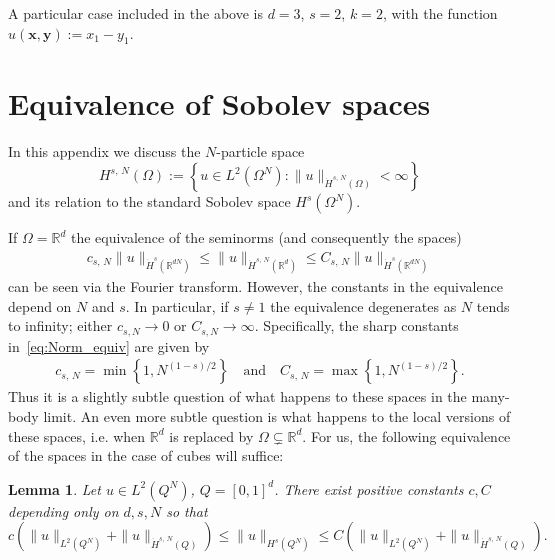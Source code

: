 \documentclass[10pt]{amsart}
\newtheorem{lemm}[theo]{Lemma}\newtheorem{prop}[theo]{Proposition}\newtheorem{coro}[theo]{Corollary}\newtheorem{conj}[theo]{Conjecture}
\theoremstyle{definition}\newtheorem{defi}[theo]{Definition}\newtheorem{rema}[theo]{Remark}\newtheorem{exam}[theo]{Example}\newtheorem{exem}[theo]{Example}\newtheorem{nota}[theo]{Notation}
\newcommand*\R {\mathbb{R}}
\newcommand\1{{\ensuremath {\mathds 1} }}
\newcommand{\bx}{\mathbf{x}}
\newcommand{\by}{\mathbf{y}}
\begin{document}
A particular case included in the above is $d=3$, $s=2$, $k=2$, with the function $u(\bx,\by) := x_1 - y_1$.



\appendix
\section{Equivalence of Sobolev spaces}\label{app:norms}


In this appendix we discuss the $N$-particle space
\begin{equation*}
H^{s,\,N}(\Omega) := \left\{u \in L^2(\Omega^N): \|u\|_{\dot{H}^{s,\,N}(\Omega)}<\infty\right\}
\end{equation*}
and its relation to the standard Sobolev space $H^s(\Omega^N)$.


If $\Omega=\R^d$ the equivalence of the seminorms (and consequently the spaces)
\begin{align}\label{eq:Norm_equiv}
c_{s,\,N}\|u\|_{\dot{H}^s(\R^{dN})}\leq \|u\|_{\dot{H}^{s,\,N}(\R^{d})}\leq C_{s,\,N}\|u\|_{\dot{H}^s(\R^{dN})}
\end{align}
can be seen via the Fourier transform. However, the constants in the equivalence depend on $N$ and $s$. In particular, if $s\neq 1$ the equivalence degenerates as $N$ tends to infinity; either $c_{s,N}\to 0$ or $C_{s,N}\to \infty$. Specifically, the sharp constants in~\eqref{eq:Norm_equiv} are given by
\begin{align*}
c_{s,\,N}=\min\left\{1, N^{(1-s)/2}\right\}
\quad \text{and} \quad C_{s,\,N}= \max\left\{1, N^{\left(1-s\right)/2}\right\}.
\end{align*}
Thus it is a slightly subtle question of what happens to these spaces in the many-body limit. An even more subtle question is what happens to the local versions of these spaces, i.e. when $\R^d$ is replaced by $\Omega \subsetneq \R^d$. For us, the following equivalence of the spaces in the case of cubes will suffice:

\begin{lemm}\label{lem:Equivalence_local_spaces}
Let $u\in L^2(Q^N)$, $Q=[0, 1]^{d}$. There exist positive constants $c, C$ depending only on $d, s, N$ so that
\begin{equation*}
c\left(\|u\|_{L^2\left(Q^N\right)}+\|u\|_{\dot{H}^{s,\,N}(Q)}\right)\leq \|u\|_{H^s(Q^N)}\leq C \left(\|u\|_{L^2\left(Q^N\right)}+\|u\|_{\dot{H}^{s,\,N}(Q)}\right).
\end{equation*}
\end{lemm}
\end{document}
